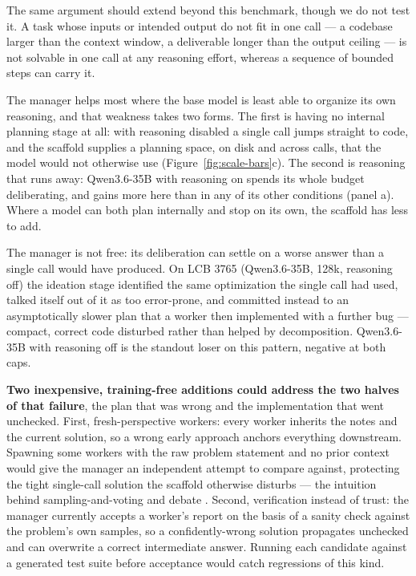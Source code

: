 \documentclass{article}
\begin{document}
The same argument should extend beyond this benchmark, though we do not test it. A task whose
inputs or intended output do not fit in one call --- a codebase larger than the context window,
a deliverable longer than the output ceiling --- is not solvable in one call at any reasoning
effort, whereas a sequence of bounded steps can carry it.

The manager helps most where the base model is least able to organize its own reasoning, and
that weakness takes two forms. The first is having no internal planning stage at all: with
reasoning disabled a single call jumps straight to code, and the scaffold supplies a planning
space, on disk and across calls, that the model would not otherwise use
(Figure~\ref{fig:scale-bars}c). The second is reasoning that runs away: Qwen3.6-35B with
reasoning on spends its whole budget deliberating, and gains more here than in any of its other
conditions (panel a). Where a model can both plan internally and stop on
its own, the scaffold has less to add.

The manager is not free: its deliberation can settle on a worse answer than a single call would
have produced. On LCB 3765 (Qwen3.6-35B, 128k, reasoning off) the ideation stage identified the
same optimization the single call had used, talked itself out of it as too error-prone, and
committed instead to an asymptotically slower plan that a worker then implemented with a further
bug --- compact, correct code disturbed rather than helped by decomposition. Qwen3.6-35B with
reasoning off is the standout loser on this pattern, negative at both caps.

\textbf{Two inexpensive, training-free additions could address the two halves of that failure},
the plan that was wrong and the implementation that went unchecked. First,
fresh-perspective workers: every worker inherits the notes and the current solution, so a
wrong early approach anchors everything downstream. Spawning some workers with the raw problem
statement and no prior context would give the manager an independent attempt to compare against,
protecting the tight single-call solution the scaffold otherwise disturbs --- the intuition
behind sampling-and-voting and debate \citep{li2024,du2023}. Second, verification instead
of trust: the manager currently accepts a worker's report on the basis of a sanity check against
the problem's own samples, so a confidently-wrong solution propagates unchecked and can overwrite
a correct intermediate answer. Running each candidate against a generated test suite before
acceptance would catch regressions of this kind.
\end{document}
